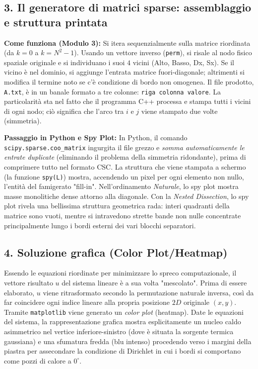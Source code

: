 \documentclass[a4paper,11pt]{article}
\theoremstyle{definition}
\begin{document}
\subsection{3. Il generatore di matrici sparse: assemblaggio e struttura printata}
\textbf{Come funziona (Modulo 3):}
Si itera sequenzialmente sulla matrice riordinata (da $k=0$ a $k=N^2-1$). Usando un vettore inverso (\texttt{perm}), si risale al nodo fisico spaziale originale e si individuano i suoi $4$ vicini (Alto, Basso, Dx, Sx). Se il vicino è nel dominio, si aggiunge l'entrata matrice fuori-diagonale; altrimenti si modifica il termine noto se c'è condizione di bordo non omogenea. 
Il file prodotto, \texttt{A.txt}, è in un banale formato a tre colonne: \texttt{riga colonna valore}. La particolarità sta nel fatto che il programma C++ processa e stampa tutti i vicini di ogni nodo; ciò significa che l'arco tra $i$ e $j$ viene stampato due volte (simmetria).

\textbf{Passaggio in Python e Spy Plot:}
In Python, il comando \texttt{scipy.sparse.coo\_matrix} ingurgita il file grezzo e \emph{somma automaticamente le entrate duplicate} (eliminando il problema della simmetria ridondante), prima di comprimere tutto nel formato CSC.
La struttura che viene stampata a schermo (la funzione \texttt{spy(L)}) mostra, accendendo un pixel per ogni elemento non nullo, l'entità del famigerato "fill-in". 
Nell'ordinamento \emph{Naturale}, lo spy plot mostra masse monolitiche dense attorno alla diagonale. Con la \emph{Nested Dissection}, lo spy plot rivela una bellissima struttura geometrica rada: interi quadranti della matrice sono vuoti, mentre si intravedono strette bande non nulle concentrate principalmente lungo i bordi esterni dei vari blocchi separatori.

\subsection{4. Soluzione grafica (Color Plot/Heatmap)}
Essendo le equazioni riordinate per minimizzare lo spreco computazionale, il vettore risultato $u$ del sistema lineare è a sua volta "mescolato".
Prima di essere elaborato, $u$ viene ritrasformato secondo la permutazione naturale inversa, così da far coincidere ogni indice lineare alla propria posizione $2D$ originale $(x,y)$.
Tramite \texttt{matplotlib} viene generato un \textit{color plot} (heatmap). Date le equazioni del sistema, la rappresentazione grafica mostra esplicitamente un nucleo caldo asimmetrico nel vertice inferiore-sinistro (dove è situata la sorgente termica gaussiana) e una sfumatura fredda (blu intenso) procedendo verso i margini della piastra per assecondare la condizione di Dirichlet in cui i bordi si comportano come pozzi di calore a $0^\circ$.
\end{document}
